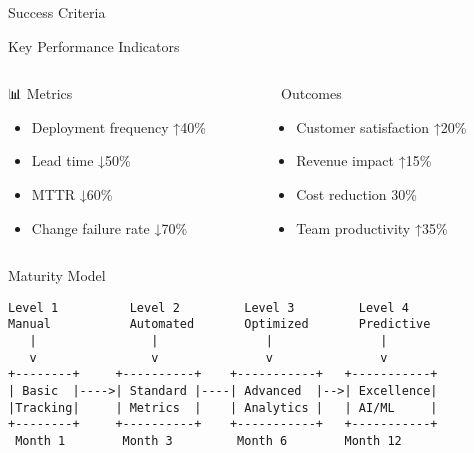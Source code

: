 \documentclass[presentation,aspectratio=169]{beamer}
\begin{document}
\begin{frame}[label={sec:orgb919183},fragile]{Success Criteria}
 \begin{block}{Key Performance Indicators}
\begin{columns}
\begin{column}{0.5\columnwidth}
📊 \alert{Metrics}
\begin{itemize}
\item Deployment frequency ↑40\%
\item Lead time ↓50\%
\item MTTR ↓60\%
\item Change failure rate ↓70\%
\end{itemize}
\end{column}
\begin{column}{0.5\columnwidth}
💼 \alert{Outcomes}
\begin{itemize}
\item Customer satisfaction ↑20\%
\item Revenue impact ↑15\%
\item Cost reduction 30\%
\item Team productivity ↑35\%
\end{itemize}
\end{column}
\end{columns}
\end{block}
\begin{block}{Maturity Model}
\begin{verbatim}
Level 1          Level 2         Level 3         Level 4
Manual           Automated       Optimized       Predictive
   |                |               |               |
   v                v               v               v
+--------+     +----------+    +-----------+   +-----------+
| Basic  |---->| Standard |----| Advanced  |-->| Excellence|
|Tracking|     | Metrics  |    | Analytics |   | AI/ML     |
+--------+     +----------+    +-----------+   +-----------+
 Month 1        Month 3         Month 6        Month 12
\end{verbatim}
\end{block}
\end{frame}
\end{document}
